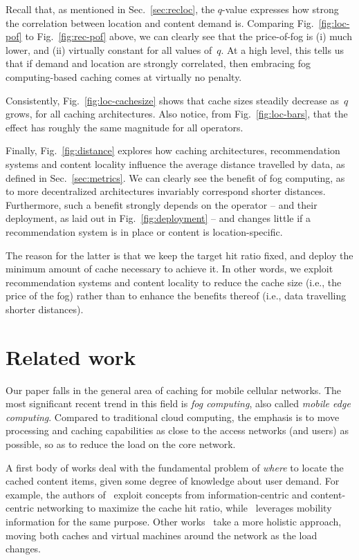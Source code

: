 \documentclass{sig-alternate-05-2015}
\newcommand{\Fig}[1]{Fig.~\ref{fig:#1}}
\newcommand{\Sec}[1]{Sec.~\ref{sec:#1}}
\begin{document}
Recall that, as mentioned in \Sec{recloc}, the $q$-value expresses how strong the correlation between location and content demand is. Comparing \Fig{loc-pof} to \Fig{rec-pof} above, we can clearly see that the price-of-fog is (i) much lower, and (ii) virtually constant for all values of~$q$. At a high level, this tells us that if demand and location are strongly correlated, then embracing  fog computing-based caching comes at virtually no penalty.

Consistently, \Fig{loc-cachesize} shows that cache sizes steadily decrease as~$q$ grows, for all caching architectures. Also notice, from \Fig{loc-bars}, that the effect has roughly the same magnitude for all operators.

Finally, \Fig{distance} explores how caching architectures, recommendation systems and content locality influence the average distance travelled by data, as defined in \Sec{metrics}. We can clearly see the benefit of fog computing, as to more decentralized architectures invariably correspond shorter distances. Furthermore, such a benefit strongly depends on the operator -- and their deployment, as laid out in \Fig{deployment} -- and changes little if a recommendation system is in place or content is location-specific.

The reason for the latter is that we keep the target hit ratio fixed, and deploy the minimum amount of cache necessary to achieve it. In other words, we exploit recommendation systems and content locality to reduce the cache size (i.e., the price of the fog) rather than to enhance the benefits thereof (i.e., data travelling shorter distances).

\section{Related work}
\label{sec:relwork}

Our paper falls in the general area of caching for mobile cellular networks. The most significant recent trend in this field is {\em fog computing}, also called {\em mobile edge computing}. Compared to traditional cloud computing, the emphasis is to move processing and caching capabilities as close to the access networks (and users) as possible, so as to reduce the load on the core network.

A first body of works deal with the fundamental problem of {\em where} to locate the cached content items, given some degree of knowledge about user demand. For example, the authors of~\cite{commag-air,icn15} exploit concepts from information-centric and content-centric networking to maximize the cache hit ratio, while~\cite{mobaware} leverages mobility information for the same purpose. Other works~\cite{moving} take a more holistic approach, moving both caches and virtual machines around the network as the load changes.
\end{document}

